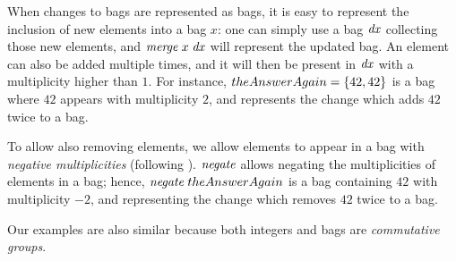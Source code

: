When changes to bags are represented as bags, it is easy to
represent the inclusion of new elements into a bag $x$: one can
simply use a bag $\mathit{dx}$ collecting those new elements, and
$\Merge{x}{\D x}$ will represent the updated bag. An element can
also be added multiple times, and it will then be present in $\mathit{dx}$
with a multiplicity higher than $1$. For instance, $theAnswerAgain =
\left\lbrace42,42\right\rbrace$ is a bag where $42$
appears with multiplicity $2$, and represents the change which
adds $42$ twice to a bag.

To allow also removing elements, we allow elements to appear in a
bag with \emph{negative multiplicities} (following
\citet{Koch10IQE}). $\mathit{negate}$ allows negating the multiplicities
of elements in a bag; hence, $\Negate{theAnswerAgain}$ is a bag
containing $42$ with multiplicity $-2$, and representing the
change which removes $42$ twice to a bag.

Our examples are also similar because both integers and bags are
\emph{commutative groups}.




